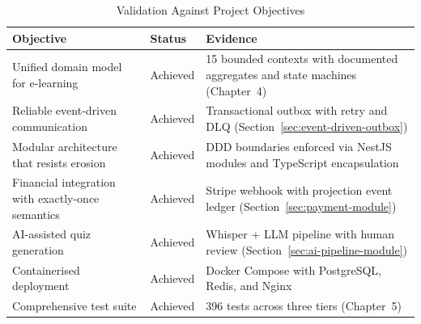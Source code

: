 \begin{table}[H]
  \centering
  \caption{Validation Against Project Objectives}\label{tab:objectives-validation}
  \small
  \begin{tabular}{@{}p{3.5cm}p{1.5cm}p{\dimexpr\textwidth-6cm\relax}@{}}
    \toprule
    \textbf{Objective} & \textbf{Status} & \textbf{Evidence} \\
    \midrule
    Unified domain model for e-learning & Achieved & 15 bounded contexts with documented aggregates and state machines (Chapter~4) \\
    Reliable event-driven communication & Achieved & Transactional outbox with retry and DLQ (Section~\ref{sec:event-driven-outbox}) \\
    Modular architecture that resists erosion & Achieved & DDD boundaries enforced via NestJS modules and TypeScript encapsulation \\
    Financial integration with exactly-once semantics & Achieved & Stripe webhook with projection event ledger (Section~\ref{sec:payment-module}) \\
    AI-assisted quiz generation & Achieved & Whisper + LLM pipeline with human review (Section~\ref{sec:ai-pipeline-module}) \\
    Containerised deployment & Achieved & Docker Compose with PostgreSQL, Redis, and Nginx \\
    Comprehensive test suite & Achieved & 396 tests across three tiers (Chapter~5) \\
    \bottomrule
  \end{tabular}
\end{table}
